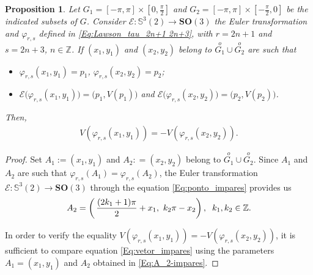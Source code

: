 \documentclass[reqno,11pt]{amsart}
\newtheorem{proposition}[theorem]{Proposition}
\begin{document}
{\begin{proposition}\label{Prop:Dois_Vetores-impares}
    Let $G_1=[-\pi,\pi]\times\left[0,\frac{\pi}{2}\right]$ and $G_2=[-\pi,\pi]\times\left[-\frac{\pi}{2},0\right]$ be the indicated subsets of $G$. Consider $\mathcal{E}: \mathbb{S}^3(2) \rightarrow \mathbf{SO}(3)$ the Euler transformation and $\varphi_{r,s}$ defined in \eqref{Eq:Lawson_tau_2n+1 2n+3}, with $r=2n+1$ and $s=2 n+3$, $n \in \mathbb{Z}$. If $(x_1,y_1)$ and $(x_2,y_2)$ belong to $\overset{o}{G_1}\cup \overset{o}{G_2}$  are such that
\begin{itemize}
    \item [i)] $\varphi_{r,s}(x_1,y_1) = p_1$, $\varphi_{r,s}(x_2,y_2)=p_2$;
    \item [ii)] $\mathcal{E}\big(\varphi_{r,s}(x_1,y_1)\big) = \big(p_1, V(p_1)\big)$ and $\mathcal{E}\big(\varphi_{r,s}(x_2,y_2)\big) = \big(p_2, V(p_2)\big)$.
\end{itemize}
Then,
\begin{eqnarray*}
    V(\varphi_{r,s}(x_1,y_1)) = - V(\varphi_{r,s}(x_2,y_2)).
\end{eqnarray*}
\end{proposition}

\begin{proof}
Set $A_1 := (x_1,y_1)$ and $A_2: =(x_2, y_2)$ belong to $\overset{o}{G_1}\cup \overset{o}{G_2}$. Since $A_1$ and $A_2$ are such that $\varphi_{r,s}(A_1) = \varphi_{r,s}(A_2)$, the Euler transformation $\mathcal{E}: \mathbb{S}^3(2) \rightarrow \mathbf{SO}(3)$ through the equation \eqref{Eq:ponto_impares} provides us  
\begin{eqnarray} \label{Eq:A_2-impares}
A_2 = \left(\, \dfrac{(2k_1+1)\pi}{2} + x_1,\, \, k_2\pi-x_2\right), \hspace{0.2cm}k_1, k_2 \in \mathbb{Z}. 
\end{eqnarray}    

\noindent 
In order to verify the equality $V(\varphi_{r,s}(x_1,y_1)) = - V(\varphi_{r,s}(x_2,y_2))$, it is sufficient to compare equation \eqref{Eq:vetor_impares} using the parameters $A_1 = (x_1,y_1)$ and $A_2$ obtained in \eqref{Eq:A_2-impares}.
\end{proof}



}
\end{document}

